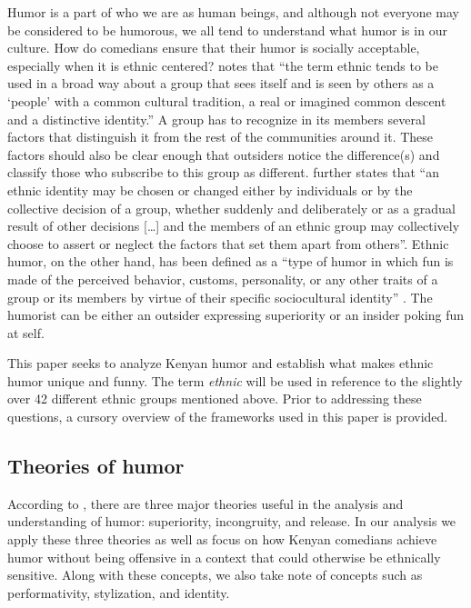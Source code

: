 \documentclass[output=paper]{langsci/langscibook}
\begin{document}
Humor is a part of who we are as human beings, and although not everyone may be considered to be humorous, we all tend to understand what humor is in our culture. How do comedians ensure that their humor is socially acceptable, especially when it is ethnic centered? \citet[1]{Davies1990} notes that “the term ethnic tends to be used in a broad way about a group that sees itself and is seen by others as a ‘people’ with a common cultural tradition, a real or imagined common descent and a distinctive identity.” A group has to recognize in its members several factors that distinguish it from the rest of the communities around it. These factors should also be clear enough that outsiders notice the difference(s) and classify those who subscribe to this group as different. \citet[1]{Davies1990} further states that “an ethnic identity may be chosen or changed either by individuals or by the collective decision of a group, whether suddenly and deliberately or as a gradual result of other decisions […] and the members of an ethnic group may collectively choose to assert or neglect the factors that set them apart from others”. Ethnic humor, on the other hand, has been defined as a “type of humor in which fun is made of the perceived behavior, customs, personality, or any other traits of a group or its members by virtue of their specific sociocultural identity” \citep[108]{Apte1985}. The humorist can be either an outsider expressing superiority or an insider poking fun at self. 

This paper seeks to analyze Kenyan humor and establish what makes ethnic humor unique and funny. The term \textit{ethnic} will be used in reference to the slightly over 42 different ethnic groups mentioned above. Prior to addressing these questions, a cursory overview of the frameworks used in this paper is provided. 

\subsection{Theories of humor}

According to \citet{Raskin1985}, there are three major theories useful in the analysis and understanding of humor: superiority, incongruity, and release. In our analysis we apply these three theories as well as focus on how Kenyan comedians achieve humor without being offensive in a context that could otherwise be ethnically sensitive. Along with these concepts, we also take note of concepts such as performativity, stylization, and identity. 
\end{document}

